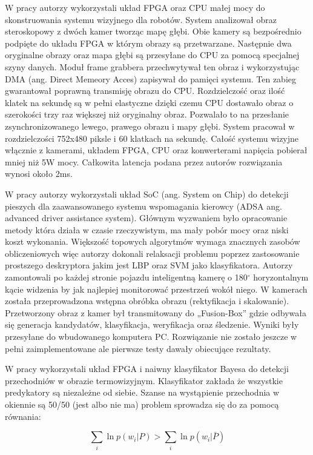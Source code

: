 W pracy \cite{honegger2014real} autorzy wykorzystali układ FPGA oraz CPU małej mocy do skonstruowania systemu wizyjnego dla robotów. System analizował obraz steroskopowy z dwóch kamer tworząc mapę głębi. Obie kamery są bezpośrednio podpięte do układu FPGA w którym obrazy są przetwarzane. Następnie dwa oryginalne obrazy oraz mapa głębi są przesyłane do CPU za pomocą specjalnej szyny danych. Moduł frame grabbera przechwytywał ten obraz i wykorzystując DMA (ang. Direct Memeory Acces) zapisywał do pamięci systemu. Ten zabieg gwarantował poprawną transmisję obrazu do CPU. Rozdzielczość oraz ilość klatek na sekundę są w pełni elastyczne dzięki czemu CPU dostawało obraz o szerokości trzy raz większej niż oryginalny obraz. Pozwalało to na przesłanie zsynchronizowanego lewego, prawego obrazu i mapy głębi. System pracował w rozdzielczości 752x480 piksle i 60 klatkach na sekundę. Całość systemu wizyjne włącznie z kamerami, układem FPGA, CPU oraz konwerterami napięcia pobierał mniej niż 5W mocy. Całkowita latencja podana przez autorów rozwiązania wynosi około 2ms.

W pracy \cite{piao2016real} autorzy wykorzystali układ SoC (ang. System on Chip) do detekcji pieszych dla zaawansowanego systemu wspomagania kierowcy (ADSA ang. advanced driver assistance system). Głównym wyzwaniem było opracowanie metody która działa w czasie rzeczywistym, ma mały pobór mocy oraz niski koszt wykonania. Większość topowych algorytmów  wymaga znacznych zasobów obliczeniowych więc autorzy dokonali relaksacji problemu poprzez zastosowanie prostszego deskryptora jakim jest LBP oraz SVM jako klasyfikatora. Autorzy zamontowali po każdej stronie pojazdu inteligentną kamerę o 180$^\circ$ horyzontalnym kącie widzenia by jak najlepiej monitorować przestrzeń wokół niego. W kamerach została przeprowadzona wstępna obróbka obrazu (rektyfikacja i skalowanie). Przetworzony obraz z kamer był transmitowany do „Fusion-Box” gdzie odbywała się generacja kandydatów, klasyfikacja, weryfikacja oraz śledzenie. Wyniki były przesyłane do wbudowanego komputera PC. Rozwiązanie nie zostało jeszcze w pełni zaimplementowane ale pierwsze testy dawały obiecujące rezultaty.


W pracy \cite{xiao_2015} wykorzystali układ FPGA i naiwny klasyfikator Bayesa do detekcji przechodniów w obrazie termowizyjnym. Klasyfikator zakłada że wszystkie predykatory są niezależne od siebie. Szanse na wystąpienie przechodnia w okiennie są 50/50 (jest albo nie ma) problem sprowadza się do za pomocą równania:

\begin{equation} \label{eq:bayes_china}
\sum_i \ln p(w_i|P) >  \sum_i \ln p(w_i|\bar{P})
\end{equation}

